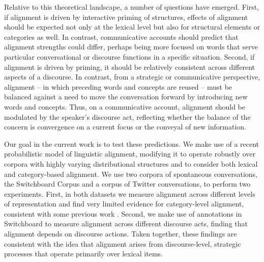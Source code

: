 \documentclass[11pt]{article}
\begin{document}
Relative to this theoretical landscape, a number of questions have emerged. First, if alignment is driven by interactive priming of structures, effects of alignment should be expected not only at the lexical level but also for structural elements or categories as well. In contrast, communicative accounts should predict that alignment strengths could differ, perhaps being more focused on words that serve particular conversational or discourse functions in a specific situation. Second, if alignment is driven by priming, it should be relatively consistent across different aspects of a discourse. In contrast, from a strategic or communicative perspective, alignment -- in which preceding words and concepts are reused -- must be balanced against a need to move the conversation forward by introducing new words and concepts. Thus, on a communicative account, alignment should be modulated by the speaker's discourse act, reflecting whether the balance of the concern is convergence on a current focus or the conveyal of new information.

Our goal in the current work is to test these predictions. We make use of a recent probabilistic model of linguistic alignment, modifying it to operate robustly over corpora with highly varying distributional structures and to consider both lexical and category-based alignment. We use two corpora of spontaneous conversations, the Switchboard Corpus and a corpus of Twitter conversations, to perform two experiments. First, in both datasets we measure alignment across different levels of representation and find very limited evidence for category-level alignment, consistent with some previous work \cite{HealeyPurverHowes2014}.  Second, we make use of annotations in Switchboard to measure alignment across different discourse acts, finding that alignment depends on discourse actions. Taken together, these findings are consistent with the idea that alignment arises from discourse-level, strategic processes that operate primarily over lexical items.



%
%

\end{document}
